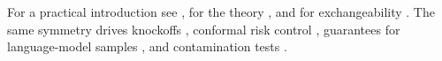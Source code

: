 \begin{refsection}
For a practical introduction see \textcite{AngelopoulosBates2023}, for the theory \textcite{Angelopoulos2024a}, and for exchangeability \textcite{deFinetti1937}. The same symmetry drives knockoffs \parencite{BarberCandes2015,Candes2018}, conformal risk control \parencite{Angelopoulos2024b}, guarantees for language-model samples \parencite{Quach2024}, and contamination tests \parencite{Oren2024}.

\printchapterbib
\end{refsection}
